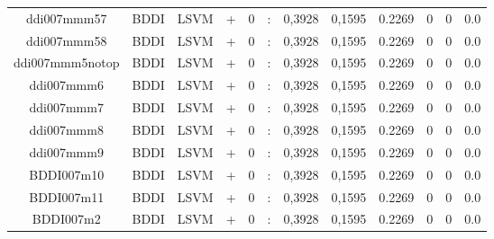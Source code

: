 \documentclass[a4paper]{article}
\begin{document}
\begin{landscape}
\begin{center}
\begin{tabular}{ |c|c|c|c|c|c|c|c|c|c|c|c|}
 	
 
 	
 		
 		\small{ ddi007mmm57 } & BDDI & LSVM & +  &  0 &  :  &  0,3928 & 0,1595 & 0.2269  &  0 & 0 & 0.0 \\
 		

 	
 
 	
 		
 		\small{ ddi007mmm58 } & BDDI & LSVM & +  &  0 &  :  &  0,3928 & 0,1595 & 0.2269  &  0 & 0 & 0.0 \\
 		

 	
 
 	
 		
 		\small{ ddi007mmm5notop } & BDDI & LSVM & +  &  0 &  :  &  0,3928 & 0,1595 & 0.2269  &  0 & 0 & 0.0 \\
 		

 	
 
 	
 		
 		\small{ ddi007mmm6 } & BDDI & LSVM & +  &  0 &  :  &  0,3928 & 0,1595 & 0.2269  &  0 & 0 & 0.0 \\
 		

 	
 
 	
 		
 		\small{ ddi007mmm7 } & BDDI & LSVM & +  &  0 &  :  &  0,3928 & 0,1595 & 0.2269  &  0 & 0 & 0.0 \\
 		

 	
 
 	
 		
 		\small{ ddi007mmm8 } & BDDI & LSVM & +  &  0 &  :  &  0,3928 & 0,1595 & 0.2269  &  0 & 0 & 0.0 \\
 		

 	
 
 	
 		
 		\small{ ddi007mmm9 } & BDDI & LSVM & +  &  0 &  :  &  0,3928 & 0,1595 & 0.2269  &  0 & 0 & 0.0 \\
 		

 	
 
 	
 		
 		\small{ BDDI007m10 } & BDDI & LSVM & +  &  0 &  :  &  0,3928 & 0,1595 & 0.2269  &  0 & 0 & 0.0 \\
 		

 	
 
 	
 		
 		\small{ BDDI007m11 } & BDDI & LSVM & +  &  0 &  :  &  0,3928 & 0,1595 & 0.2269  &  0 & 0 & 0.0 \\
 		

 	
 
 	
 		
 		\small{ BDDI007m2 } & BDDI & LSVM & +  &  0 &  :  &  0,3928 & 0,1595 & 0.2269  &  0 & 0 & 0.0 \\
 		


\end{tabular}
\end{center}
\end{landscape}
\end{document}
